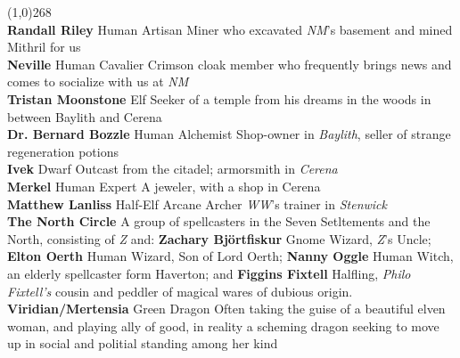 \documentclass[letterpaper]{article}
\newcommand{\colline}{\noindent\line(1,0){268} \\}
\newcommand{\e}[1]{\emph{#1}}
\newcommand{\B}[1]{\textbf{#1}}
\newenvironment{notesection}[1]
{\noindent {\huge \B{#1}} \par
\vspace{-0.75em}
\colline
\begingroup\fontsize{9pt}{12pt}\selectfont}
{\endgroup}
\newcommand{\person}[3]{\noindent\B{#1
    \ifstrequal{#2}{M}{{\color{ProcessBlue}\male}}{%
    \ifstrequal{#2}{F}{\color{VioletRed}\female}{}}}{\scriptsize #3}}
\begin{document}
\begin{notesection}{People and Places}
\person{Randall Riley}{M}{Human Artisan} Miner who excavated \e{NM}'s basement and mined Mithril for us\\
\person{Neville}{M}{Human Cavalier} Crimson cloak member who frequently brings news and comes to socialize with us at \e{NM}\\
\person{Tristan Moonstone}{M}{Elf} Seeker of a temple from his dreams in the woods in between Baylith and Cerena\\
\person{Dr. Bernard Bozzle}{M}{Human Alchemist} Shop-owner in \e{Baylith}, seller of strange regeneration potions\\
\person{Ivek}{M}{Dwarf} Outcast from the citadel; armorsmith in \e{Cerena}\\
\person{Merkel}{F}{Human Expert} A jeweler, with a shop in Cerena\\
\person{Matthew Lanliss}{M}{Half-Elf Arcane Archer} \e{WW}'s trainer in \e{Stenwick}\\
\noindent\B{The North Circle} A group of spellcasters in the Seven Setltements and the North, consisting of \e{Z} and: \person{Zachary Bj\"{o}rtfiskur}{M}{Gnome Wizard}, \e{Z}'s Uncle; \person{Elton Oerth}{M}{Human Wizard}, Son of Lord Oerth; \person{Nanny Oggle}{F}{Human Witch}, an elderly spellcaster form Haverton; and \person{Figgins Fixtell}{M}{Halfling}, \e{Philo Fixtell's} cousin and peddler of magical wares of dubious origin. \\
\person{Viridian/Mertensia}{F}{Green Dragon} Often taking the guise of a beautiful elven woman, and playing ally of good, in reality a scheming dragon seeking to move up in social and politial standing among her kind \\


\end{notesection}
\end{document}
